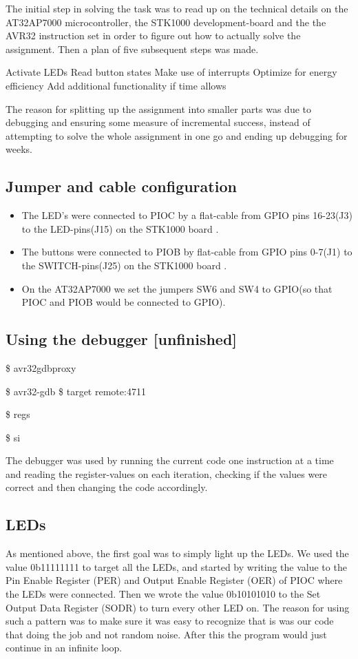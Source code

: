 The initial step in solving the task was to read up on the technical details on the AT32AP7000 microcontroller, the STK1000 development-board and the the AVR32 instruction set in order to figure out how to actually solve the assignment. Then a plan of five subsequent steps was made.

Activate LEDs
Read button states
Make use of interrupts
Optimize for energy efficiency
Add additional functionality if time allows

The reason for splitting up the assignment into smaller parts was due to debugging and ensuring some measure of incremental success, instead of attempting to solve the whole assignment in one go and ending up debugging for weeks.
\subsection{Jumper and cable configuration}


\begin{itemize}
\item The LED’s were connected to PIOC by a flat-cable from GPIO pins 16-23(J3) to the LED-pins(J15) on the STK1000 board \cite[section~2.4.1]{compendium}. 
\item The buttons were connected to PIOB by flat-cable from GPIO pins 0-7(J1) to the SWITCH-pins(J25) on the STK1000 board \cite[section~2.4.1]{compendium}.
\item On the AT32AP7000 we set the jumpers SW6 and SW4 to GPIO(so that PIOC and PIOB would be connected to GPIO)\cite[table~2.3]{compendium}.
\end{itemize}

\subsection{Using the debugger [unfinished]}

\$ avr32gdbproxy

\$ avr32-gdb
\$ target remote:4711

\$ regs

\$ si

The debugger was used by running the current code one instruction at a time and reading the register-values on each iteration, checking if the values were correct and then changing the code accordingly.
\subsection{LEDs}

As mentioned above, the first goal was to simply light up the LEDs. We used the value 0b11111111 to target all the LEDs, and started by writing the value to the Pin Enable Register (PER) and Output Enable Register (OER) of PIOC where the LEDs were connected. Then we wrote the value 0b10101010 to the Set Output Data Register (SODR) to turn every other LED on. The reason for using such a pattern was to make sure it was easy to recognize that is was our code that doing the job and not random noise. After this the program would just continue in an infinite loop.

